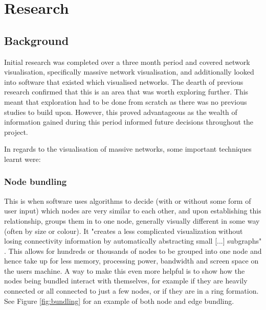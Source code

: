 \documentclass[../dissertation.tex]{subfiles}
\begin{document}
\chapter{Research}
\label{sec:research}

\section{Background}
\label{sec:background}

Initial research was completed over a three month period and covered network visualisation, specifically massive network visualisation, and additionally looked into software that existed which visualised networks. The dearth of previous research confirmed that this is an area that was worth exploring further. This meant that exploration had to be done from scratch as there was no previous studies to build upon. However, this proved advantageous as the wealth of information gained during this period informed future decisions throughout the project.

In regards to the visualisation of massive networks, some important techniques learnt were:

\subsection{Node bundling}
\label{sec:node_bundling}
This is when software uses algorithms to decide (with or without some form of user input) which nodes are very similar to each other, and upon establishing this relationship, groups them in to one node, generally visually different in some way (often by size or colour). It "creates a less complicated visualization without losing connectivity information by automatically abstracting small [...] subgraphs" \cite{six2003effective}. This allows for hundreds or thousands of nodes to be grouped into one node and hence take up for less memory, processing power, bandwidth and screen space on the users machine. A way to make this even more helpful is to show how the nodes being bundled interact with themselves, for example if they are heavily connected or all connected to just a few nodes, or if they are in a ring formation. See Figure \ref{fig:bundling} for an example of both node and edge bundling.
    
\end{document}
